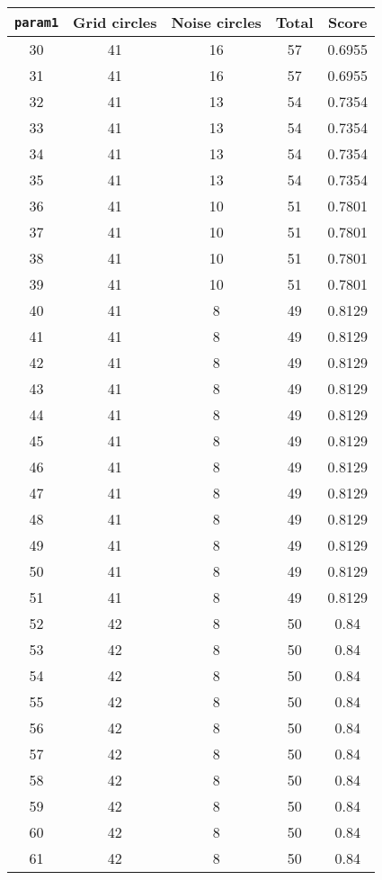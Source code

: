 \documentclass[letterpaper, 12pt]{article}
\begin{document}
\begin{longtable}{|c|c|c|c|c|}
\hline
\textbf{\texttt{param1}} & \textbf{Grid circles} & \textbf{Noise circles} & \textbf{Total} & \textbf{Score} \\
\hline
30 & 41 & 16 & 57 & 0.6955 \\
\hline
31 & 41 & 16 & 57 & 0.6955 \\
\hline
32 & 41 & 13 & 54 & 0.7354 \\
\hline
33 & 41 & 13 & 54 & 0.7354 \\
\hline
34 & 41 & 13 & 54 & 0.7354 \\
\hline
35 & 41 & 13 & 54 & 0.7354 \\
\hline
36 & 41 & 10 & 51 & 0.7801 \\
\hline
37 & 41 & 10 & 51 & 0.7801 \\
\hline
38 & 41 & 10 & 51 & 0.7801 \\
\hline
39 & 41 & 10 & 51 & 0.7801 \\
\hline
40 & 41 & 8 & 49 & 0.8129 \\
\hline
41 & 41 & 8 & 49 & 0.8129 \\
\hline
42 & 41 & 8 & 49 & 0.8129 \\
\hline
43 & 41 & 8 & 49 & 0.8129 \\
\hline
44 & 41 & 8 & 49 & 0.8129 \\
\hline
45 & 41 & 8 & 49 & 0.8129 \\
\hline
46 & 41 & 8 & 49 & 0.8129 \\
\hline
47 & 41 & 8 & 49 & 0.8129 \\
\hline
48 & 41 & 8 & 49 & 0.8129 \\
\hline
49 & 41 & 8 & 49 & 0.8129 \\
\hline
50 & 41 & 8 & 49 & 0.8129 \\
\hline
51 & 41 & 8 & 49 & 0.8129 \\
\hline
52 & 42 & 8 & 50 & 0.84 \\
\hline
53 & 42 & 8 & 50 & 0.84 \\
\hline
54 & 42 & 8 & 50 & 0.84 \\
\hline
55 & 42 & 8 & 50 & 0.84 \\
\hline
56 & 42 & 8 & 50 & 0.84 \\
\hline
57 & 42 & 8 & 50 & 0.84 \\
\hline
58 & 42 & 8 & 50 & 0.84 \\
\hline
59 & 42 & 8 & 50 & 0.84 \\
\hline
60 & 42 & 8 & 50 & 0.84 \\
\hline
61 & 42 & 8 & 50 & 0.84 \\

\end{longtable}
\end{document}
